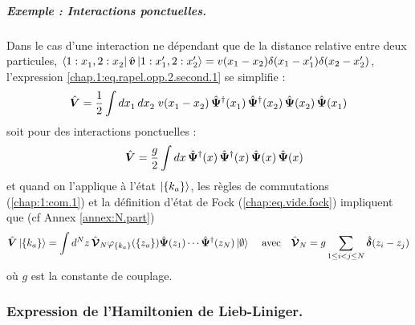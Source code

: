 \begin{mdframed}[
	linewidth=0.5pt, 
	backgroundcolor=gray!5, 
	roundcorner=50pt,	
	innerleftmargin=5pt,
    innerrightmargin=5pt,
    innertopmargin=-10pt,
    innerbottommargin=2pt,
    leftmargin=2pt,
    rightmargin=2pt
	]
\subparagraph{Exemple : Interactions ponctuelles.} 
Dans le cas d’une interaction ne dépendant que de la distance relative entre deux particules, $\bra{ 1 : x_1^{}, 2 : x_2^{} } \hat{\bm{v}} \ket{ 1 : x_1', 2 : x_2' } = v(x_1 -x_2)\delta(x_1 - x_1')\delta(x_2 - x_2') $,  l'expression \eqref{chap.1:eq.rapel.opp.2.second.1} se simplifie :
\begin{eqnarray}
     \hat{\bm{V}} =  
    \frac{1}{2} \int dx_1^{} \, dx_2^{} \; v(x_1^{} - x_2^{}) \,
    \hat{\bm{\Psi}}^\dagger(x_1^{}) \, \hat{\bm{\Psi}}^\dagger(x_2^{}) \, 
    \hat{\bm{\Psi}}(x_2^{}) \, \hat{\bm{\Psi}}(x_1^{})
    \label{eq:V_local}
\end{eqnarray} 
soit pour des interactions ponctuelles :	
\begin{eqnarray}\label{chap.1:eq.rapel.opp.2.second.ponctuel.1}
	\quad \hat{\bm{V}}  = \frac{g}{2} \int dx \,
    \hat{\bm{\Psi}}^\dagger(x) \, \hat{\bm{\Psi}}^\dagger(x) \, 
    \hat{\bm{\Psi}}(x) \, \hat{\bm{\Psi}}(x)  		
\end{eqnarray}
et quand on l'applique à l'état $\ket{\{k_a\}}$, les règles de commutations (\ref{chap:1:com.1}) et la définition d'état de Fock (\ref{chap:eq.vide.fock}) impliquent que (cf Annex \ref{annex:N.part})
\begin{eqnarray}\label{chap.1:eq.rapel.opp.2.second.ponctuel.2}
\hat{\bm{V}}\ket{\{k_a \}} =  \int d^Nz \, \hat{\bm{\mathcal{V}}}_N \varphi_{\{k_a\}}( \{z_a\} )\hat{\bm{\Psi}}(z_1)\cdots \hat{\bm{\Psi}}^\dag(z_N) \ket{\emptyset} \, \quad \mbox{avec} \quad  \hat{\bm{\mathcal{V}}}_N 	= g\sum_{1\leq i < j \leq N } \hat{\bm{\delta}}(z_i - z_j)	
\end{eqnarray}
où \( g \) est la constante de couplage.
\end{mdframed}




\subsubsection{Expression de l’Hamiltonien de Lieb-Liniger. }

